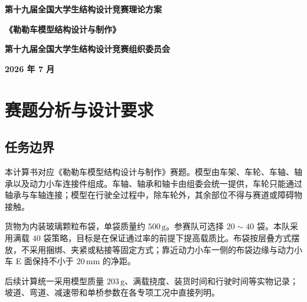 \documentclass[UTF8,a4paper,12pt,fontset=none]{ctexart}
\numberwithin{equation}{section}
\numberwithin{figure}{section}
\numberwithin{table}{section}
\newcommand{\mm}{\,\mathrm{mm}}
\newcommand{\g}{\,\mathrm{g}}
\begin{document}
\songti{}
\pagestyle{empty}

\thispagestyle{empty}
\vspace*{0.6cm}
\begin{center}
{\heiti\bfseries{} 第十九届全国大学生结构设计竞赛理论方案}\par
\vspace{4.2cm}
{\heiti\bfseries{}《勒勒车模型结构设计与制作》}\par
\vfill
{\heiti\bfseries{} 第十九届全国大学生结构设计竞赛组织委员会}\par
\vspace{0.8cm}
{\heiti\bfseries{} 2026 年 7 月}\par
\end{center}
\newpage

\thispagestyle{empty}
\tableofcontents
\newpage
{}
\pagestyle{plain}
{}

\newpage
{}
{}

\newpage

\setcounter{page}{1}
\pagestyle{fancy}
\section{赛题分析与设计要求}

\subsection{任务边界}
本计算书对应《勒勒车模型结构设计与制作》赛题。模型由车架、车轮、车轴、轴承以及动力小车连接件组成。车轴、轴承和轴卡由组委会统一提供，车轮只能通过轴承与车轴连接；模型在行驶全过程中，除车轮外，其余部位不得与赛道或障碍物接触。

货物为内装玻璃颗粒布袋，单袋质量约 $500\g$。参赛队可选择 $20\sim40$ 袋。本队采用满载 $40$ 袋策略，目标是在保证通过率的前提下提高载质比。布袋按层叠方式摆放，不采用捆绑、夹紧或粘接等固定方式；靠近动力小车一侧的布袋边缘与动力小车 E 面保持不小于 $20\mm$ 的净距。

后续计算统一采用模型质量 $203\g$、满载挠度、装货时间和行驶时间等实物记录；坡道、弯道、减速带和单桥参数在各专项工况中直接列明。
\end{document}
